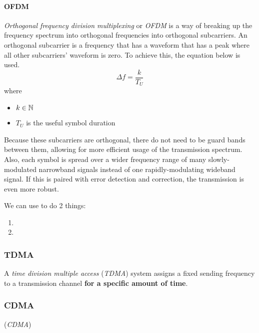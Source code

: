 \paragraph{OFDM}\label{par:OFDM}
\begin{definition}\label{def:OFDM}
  \emph{Orthogonal frequency division multiplexing} or \emph{OFDM} is a way of breaking up the frequency spectrum into orthogonal frequencies into orthogonal subcarriers.
  An orthogonal subcarrier is a frequency that has a waveform that has a peak where all other subcarriers' waveform is zero.
  To achieve this, the equation below is used.
  \begin{equation}\label{eq:Orthogonal_Subcarrier}
    \Delta f = \frac{k}{T_{U}}
  \end{equation}
  where
  \begin{itemize}[noitemsep]
  \item $k \in \operatorname{\mathbb{N}}$
  \item $T_{U}$ is the useful symbol duration
  \end{itemize}

  Because these subcarriers are orthogonal, there do not need to be guard bands between them, allowing for more efficient usage of the transmission spectrum.
  Also, each symbol is spread over a wider frequency range of many slowly-modulated narrowband signals instead of one rapidly-modulating wideband signal.
  If this is paired with error detection and correction, the transmission is even more robust.
\end{definition}

We can use  to do 2 things:
\begin{enumerate}[noitemsep]
\item {}
\item {}
\end{enumerate}

\subsubsection{TDMA}\label{subsubsec:TDMA}
\begin{definition}\label{def:TDMA}
  A \emph{time division multiple access}  (\emph{TDMA}) system assigns a fixed sending frequency to a transmission channel \textbf{for a specific amount of time}.
\end{definition}


\subsubsection{CDMA}\label{subsubsec:CDMA}
\begin{definition}\label{def:CDMA}
   (\emph{CDMA})
\end{definition}

